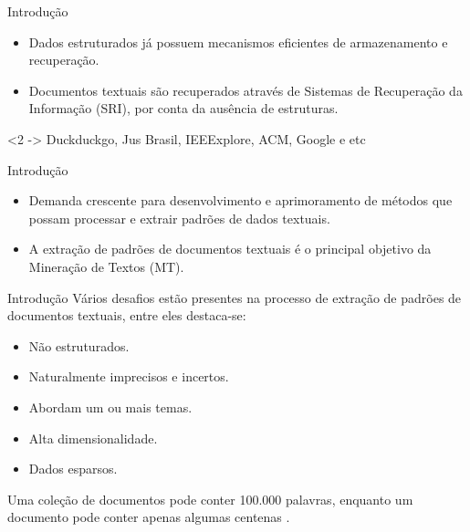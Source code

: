 \documentclass[brazil]{beamer}
\begin{document}
\begin{frame}{Introdução}
  \begin{itemize}
    \item<1 -> Dados estruturados já possuem mecanismos eficientes de armazenamento e recuperação.
    \item<2 -> \alert{Documentos textuais} são recuperados através de Sistemas de Recuperação da
      Informação (SRI), por conta da \alert{ausência de estruturas}. 
  \end{itemize}
  \begin{examples}<2 ->
    Duckduckgo, Jus Brasil, IEEExplore, ACM, Google e etc 
  \end{examples}
\end{frame}


\begin{frame}{Introdução}
  \begin{itemize}
    \item Demanda crescente para desenvolvimento e aprimoramento de métodos que possam
      processar e \alert{extrair padrões} de \alert{dados textuais}. 
    \item A extração de padrões de documentos textuais é o principal objetivo da Mineração de Textos
      (MT).
  \end{itemize}
\end{frame}

\begin{frame}{Introdução}
  Vários desafios estão presentes na processo de extração de padrões de documentos textuais, entre
  eles destaca-se:
  \begin{itemize}
    \item Não estruturados.
    \item Naturalmente \alert{imprecisos} e \alert{incertos}. 
    \item Abordam um ou mais temas. 
    \item \alert{Alta dimensionalidade}.
    \item Dados \alert{esparsos}.
  \end{itemize}
  \begin{examples}
    Uma coleção de documentos pode conter 100.000 palavras, enquanto um documento pode conter apenas
    algumas centenas \cite{Aggarwal2012}.
  \end{examples}
\end{frame}
\end{document}
